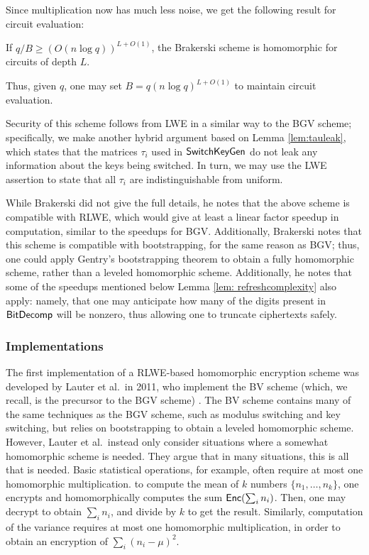         Since multiplication now has much less noise, we get the following result for circuit evaluation:
        \begin{lemma}
            If $q/B \geq (O(n \log q))^{L + O(1)}$, the Brakerski scheme is homomorphic for circuits of depth $L$.
        \end{lemma}

        Thus, given $q$, one may set $B = q(n \log q)^{L + O(1)}$ to maintain circuit evaluation.

        Security of this scheme follows from LWE in a similar way to the BGV scheme; specifically, we make another hybrid argument based on Lemma \ref{lem:tauleak}, which states that the matrices $\tau_i$ used in ${\sf SwitchKeyGen}$ do not leak any information about the keys being switched. In turn, we may use the LWE assertion to state that all $\tau_i$ are indistinguishable from uniform.

        While Brakerski did not give the full details, he notes that the above scheme is compatible with RLWE, which would give at least a linear factor speedup in computation, similar to the speedups for BGV. Additionally, Brakerski notes that this scheme is compatible with bootstrapping, for the same reason as BGV; thus, one could apply Gentry's bootstrapping theorem to obtain a fully homomorphic scheme, rather than a leveled homomorphic scheme. Additionally, he notes that some of the speedups mentioned below Lemma \ref{lem: refreshcomplexity} also apply: namely, that one may anticipate how many of the digits present in ${\sf BitDecomp}$ will be nonzero, thus allowing one to truncate ciphertexts safely.

    \subsubsection{Implementations}
    The first implementation of a RLWE-based homomorphic encryption scheme was developed by Lauter et al.~in 2011, who implement the BV scheme (which, we recall, is the precursor to the BGV scheme) \cite{bvpractical}. The BV scheme contains many of the same techniques as the BGV scheme, such as modulus switching and key switching, but relies on bootstrapping to obtain a leveled homomorphic scheme. However, Lauter et al.~instead only consider situations where a somewhat homomorphic scheme is needed. They argue that in many situations, this is all that is needed. Basic statistical operations, for example, often require at most one homomorphic multiplication. to compute the mean of $k$ numbers $\{n_1, \dots, n_k\}$, one encrypts and homomorphically computes the sum ${\sf Enc}(\sum_i n_i)$. Then, one may decrypt to obtain $\sum_i n_i$, and divide by $k$ to get the result. Similarly, computation of the variance requires at most one homomorphic multiplication, in order to obtain an encryption of $\sum_i (n_i - \mu)^2$.

